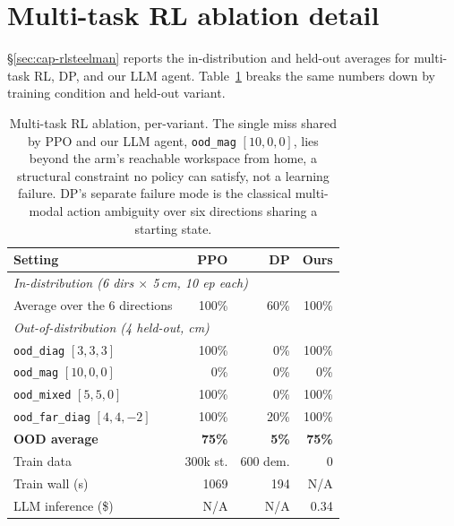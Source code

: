\section{Multi-task RL ablation detail}
\label{app:multitask}

\S\ref{sec:cap-rlsteelman} reports the in-distribution and
held-out averages for multi-task RL, DP, and our LLM agent.
Table~\ref{tab:multitask-detail} breaks the same numbers down by
training condition and held-out variant.

\begin{table}[H]
\centering
\small
\setlength{\tabcolsep}{3pt}
\begin{tabular}{lrrr}
\toprule
\textbf{Setting} & \textbf{PPO} & \textbf{DP} & \textbf{Ours} \\
\midrule
\multicolumn{4}{l}{\emph{In-distribution (6 dirs $\times$ 5\,cm, 10 ep each)}} \\
Average over the 6 directions & 100\% & 60\% & 100\% \\
\midrule
\multicolumn{4}{l}{\emph{Out-of-distribution (4 held-out, cm)}} \\
\texttt{ood\_diag} $[3,3,3]$       & 100\% &  0\% & 100\% \\
\texttt{ood\_mag} $[10,0,0]$       &   0\% &  0\% &   0\% \\
\texttt{ood\_mixed} $[5,5,0]$      & 100\% &  0\% & 100\% \\
\texttt{ood\_far\_diag} $[4,4,{-}2]$ & 100\% & 20\% & 100\% \\
\textbf{OOD average}                    & \textbf{75\%} & \textbf{5\%} & \textbf{75\%} \\
\midrule
Train data       & 300k st. & 600 dem. & 0 \\
Train wall (s)   & 1069     & 194      & N/A \\
LLM inference (\$) & N/A      & N/A       & 0.34    \\
\bottomrule
\end{tabular}
\caption{Multi-task RL ablation, per-variant. The single miss
shared by PPO and our LLM agent, \texttt{ood\_mag} $[10,0,0]$,
lies beyond the arm's reachable workspace from home, a structural
constraint no policy can satisfy, not a learning failure. DP's
separate failure mode is the classical multi-modal action
ambiguity over six directions sharing a starting state.}
\label{tab:multitask-detail}
\end{table}

